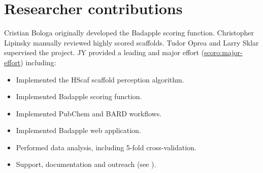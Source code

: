\section{Researcher contributions}

Cristian Bologa originally developed the Badapple scoring function. Christopher Lipinsky manually reviewed highly scored scaffolds. Tudor Oprea and Larry Sklar supervised the project. JY provided a leading and major effort (\href{http://purl.org/spar/scoro/major-effort}{scoro:major-effort}) including:

\begin{itemize}
    \item Implemented the HScaf scaffold perception algorithm.
    \item Implemented Badapple scoring function.
    \item Implemented PubChem and BARD workflows.
    \item Implemented Badapple web application.
    \item Performed data analysis, including 5-fold cross-validation.
    \item Support, documentation and outreach (see ).
\end{itemize}

